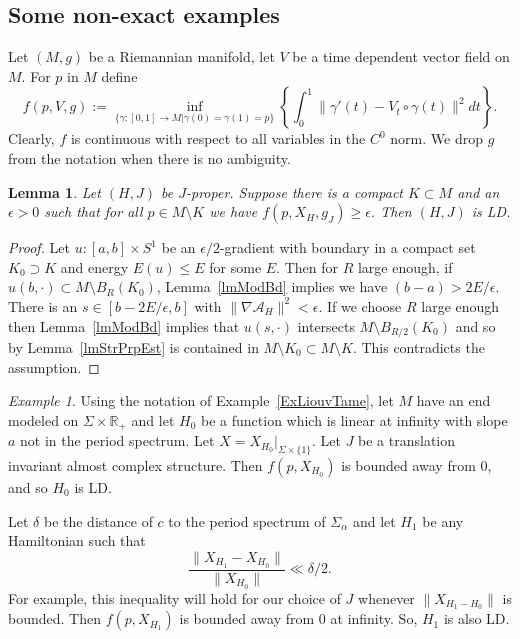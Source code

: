\documentclass[11pt]{amsart}
\newcommand{\R}{\mathbb{R}}
\newtheorem{lm}[tm]{Lemma}
\theoremstyle{definition}
\theoremstyle{remark}
\newtheorem{ex}[tm]{Example}
\begin{document}
\subsection{Some non-exact examples}\label{SubsecNonex}
Let $(M,g)$ be a Riemannian manifold, let $V$ be a time dependent vector field on $M$. For $p$ in $M$ define
\[
f(p,V,g):=\inf_{\{\gamma:[0,1]\to M|\gamma(0)=\gamma(1)=p\}}\left\{\int_0^1\|\gamma'(t)-V_t\circ\gamma(t)\|^2dt\right\}.
\]
Clearly, $f$ is continuous with respect to all variables in the $C^0$ norm. We drop $g$ from the notation when there is no ambiguity.
\begin{lm}
Let $(H,J)$ be $J$-proper. Suppose there is a compact $K\subset M$ and an $\epsilon>0$ such that for all $p\in M\setminus K$ we have $f(p,X_H,g_J)\geq\epsilon$. Then $(H,J)$ is LD.
\end{lm}
\begin{proof}
Let $u:[a,b]\times S^1$ be an $\epsilon/2$-gradient with boundary in a compact set $K_0\supset K$  and energy $E(u)\leq E$ for some $E$. Then for $R$ large enough, if $u(b,\cdot)\subset M\setminus B_R(K_0)$, Lemma~\ref{lmModBd} implies we have $(b-a)> 2E/\epsilon$. There is an $s\in[b-2E/\epsilon,b]$ with $\|\nabla\mathcal{A}_H\|^2 <\epsilon$. If we choose $R$ large enough then Lemma~\ref{lmModBd} implies that $u(s,\cdot)$ intersects $M\setminus B_{R/2}(K_0)$ and so by Lemma~\ref{lmStrPrpEst} is contained in $M\setminus K_0\subset M\setminus K$. This contradicts the assumption.

\end{proof}

\begin{ex}\label{exLinLiou}
Using the notation of Example~\ref{ExLiouvTame}, let $M$ have an end modeled on $\Sigma\times\R_+$ and let $H_0$ be a function which is linear at infinity with slope $a$ not in the period spectrum. Let $X=X_{H_0}|_{\Sigma\times\{1\}}$. Let $J$ be a translation invariant almost complex structure. Then $f(p, X_{H_0})$ is bounded away from $0$, and so $H_0$ is LD.

Let $\delta$ be the distance of $c$ to the period spectrum of $\Sigma_{\alpha}$ and let $H_1$ be any Hamiltonian such that
\[
\frac{\|X_{H_1}-X_{H_0}\|}{\|X_{H_0}\|}\ll\delta/2.
\]
For example, this inequality will hold for our choice of $J$ whenever $\|X_{H_1-H_0}\|$ is bounded.  Then $f(p,X_{H_1})$ is bounded away from $0$ at infinity. So, $H_1$ is also LD.
\end{ex}
\end{document}
